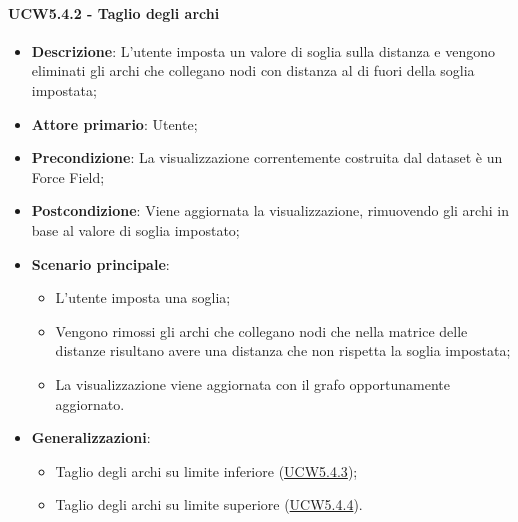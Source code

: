 \paragraph{UCW5.4.2 - Taglio degli archi}
\label{par:ucw5.4.2}
\begin{itemize}
    \item \textbf{Descrizione}:     L'utente imposta un valore di soglia sulla distanza e vengono eliminati gli archi che collegano nodi con distanza al di fuori della soglia impostata;
    \item \textbf{Attore primario}: Utente;
    \item \textbf{Precondizione}:   La visualizzazione correntemente costruita dal dataset è un Force Field;
    \item \textbf{Postcondizione}:  Viene aggiornata la visualizzazione, rimuovendo gli archi in base al valore di soglia impostato;
    \item \textbf{Scenario principale}:
          \begin{itemize}
              \item L'utente imposta una soglia;
              \item Vengono rimossi gli archi che collegano nodi che nella matrice delle distanze risultano avere una distanza che non rispetta la soglia impostata;
              \item La visualizzazione viene aggiornata con il grafo opportunamente aggiornato.
          \end{itemize}

    \item \textbf{Generalizzazioni}:
          \begin{itemize}
              \item Taglio degli archi su limite inferiore (\hyperref[par:ucw5.4.3]{UCW5.4.3});
              \item Taglio degli archi su limite superiore (\hyperref[par:ucw5.4.4]{UCW5.4.4}).
          \end{itemize}
\end{itemize}

